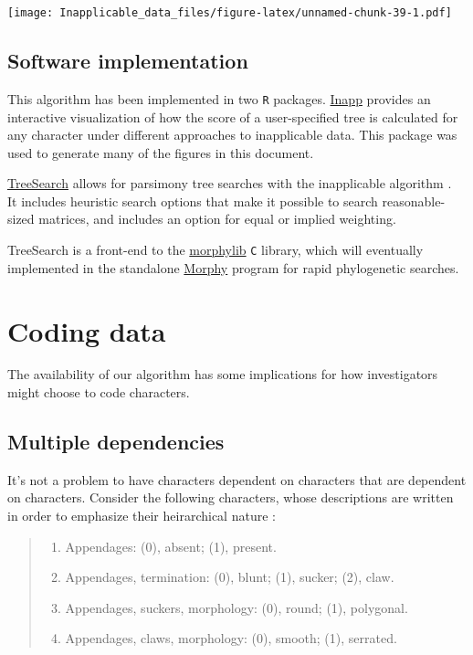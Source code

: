 \documentclass[]{book}
\theoremstyle{definition}
\theoremstyle{definition}
\theoremstyle{definition}
\theoremstyle{remark}
\begin{document}
\texttt{[image: Inapplicable\_data\_files/figure-latex/unnamed-chunk-39-1.pdf]}

\hypertarget{software}{\section{Software
implementation}\label{software}}

This algorithm has been implemented in two \texttt{R} packages.
\href{https://github.com/TGuillerme/Inapp}{Inapp} provides an
interactive visualization of how the score of a user-specified tree is
calculated for any character under different approaches to inapplicable
data. This package was used to generate many of the figures in this
document.

\href{https://github.com/ms609/TreeSearch}{TreeSearch} allows for
parsimony tree searches with the inapplicable algorithm
\citep{Brazeau2018}.\\
It includes heuristic search options that make it possible to search
reasonable-sized matrices, and includes an option for equal or implied
weighting.

TreeSearch is a front-end to the
\href{https://github.com/mbrazeau/morphylib}{morphylib} \texttt{C}
library, which will eventually implemented in the standalone
\href{http://www.morphyproject.org/}{Morphy} program for rapid
phylogenetic searches.

\hypertarget{coding}{\chapter{Coding data}\label{coding}}

The availability of our algorithm has some implications for how
investigators might choose to code characters.

\section{Multiple dependencies}\label{multiple-dependencies}

It's not a problem to have characters dependent on characters that are
dependent on characters. Consider the following characters, whose
descriptions are written in order to emphasize their heirarchical nature
\citep[following the recommendations of][]{Sereno2007}:

\begin{quote}
\begin{enumerate}
\def\labelenumi{\arabic{enumi}.}
\item
  Appendages: (0), absent; (1), present.
\item
  Appendages, termination: (0), blunt; (1), sucker; (2), claw.
\item
  Appendages, suckers, morphology: (0), round; (1), polygonal.
\item
  Appendages, claws, morphology: (0), smooth; (1), serrated.
\end{enumerate}
\end{quote}
\end{document}

